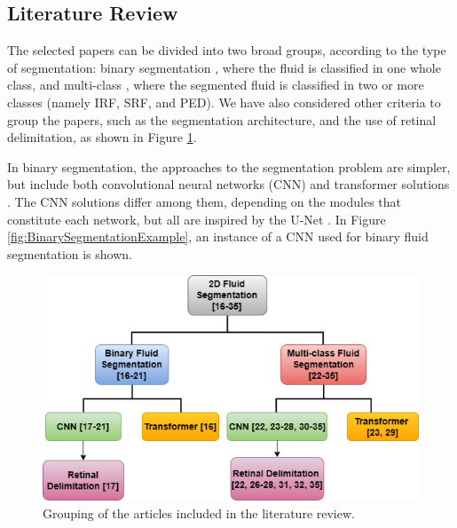 \subsection{Literature Review}\label{FluidSegmentationLiteratureReview}
The selected papers can be divided into two broad groups, according to the type of segmentation: binary segmentation \parencite{Quek2022, Pawan2021, Liu2021, Guo2020, Wang2021, Wu2023}, where the fluid is classified in one whole class, and multi-class \parencite{Rahil2023, Hassan2021a, Zhang2023, Sappa2021, Xing2022, Tang2022, Padilla2022, Hu2019, Mantel2021, Liu2024, Li2023, Gao2019, Hassan2021b, Lu2019}, where the segmented fluid is classified in two or more classes (namely IRF, SRF, and PED). We have also considered other criteria to group the papers, such as the segmentation architecture, and the use of retinal delimitation, as shown in Figure \ref{fig:ArticlesSelection}.
\par
In binary segmentation, the approaches to the segmentation problem are simpler, but include both convolutional neural networks (CNN) \parencite{Pawan2021, Liu2021, Guo2020, Wang2021, Wu2023} and transformer solutions \parencite{Quek2022}. The CNN solutions differ among them, depending on the modules that constitute each network, but all are inspired by the U-Net \parencite{Ronneberger2015}. In Figure \ref{fig:BinarySegmentationExample}, an instance of a CNN used for binary fluid segmentation is shown.
\begin{figure}[!ht]
	\centering
	\includegraphics[width=0.75\linewidth]{figures/ArticlesSelection.png}
	\caption{Grouping of the articles included in the literature review.}
	\label{fig:ArticlesSelection}
\end{figure}
